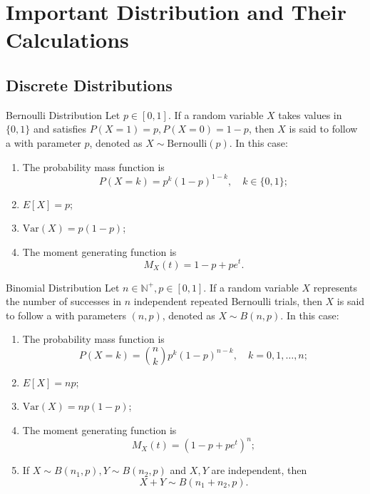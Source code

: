 \documentclass[../main.tex]{subfiles}
\begin{document}
\ifSubfilesClassLoaded{

    
}{}

\chapter{ Important Distribution and Their Calculations }
\section{Discrete Distributions}
\begin{proposition}{Bernoulli Distribution}{}
Let $p \in [0,1]$. If a random variable $X$ takes values in $\{0,1\}$ and satisfies $P(X=1)=p, P(X=0)=1-p$, then $X$ is said to follow a  with parameter $p$, denoted as $X \sim \text{Bernoulli}(p)$. In this case:

\begin{enumerate}
\item The probability mass function is 
\[P(X=k) = p^k(1-p)^{1-k}, \quad k \in \{0,1\};\]

\item $E[X] = p$;

\item $\text{Var}(X) = p(1-p)$;

\item The moment generating function is 
\[M_X(t) = 1-p+pe^t.\]
\end{enumerate}
\end{proposition}

\begin{proposition}{Binomial Distribution}{}
Let $n \in \mathbb{N}^+, p \in [0,1]$. If a random variable $X$ represents the number of successes in $n$ independent repeated Bernoulli trials, then $X$ is said to follow a  with parameters $(n,p)$, denoted as $X \sim B(n,p)$. In this case:

\begin{enumerate}
\item The probability mass function is 
\[P(X=k) = \binom{n}{k}p^k(1-p)^{n-k}, \quad k=0,1,\ldots,n;\]

\item $E[X] = np$;

\item $\text{Var}(X) = np(1-p)$;

\item The moment generating function is 
\[M_X(t) = (1-p+pe^t)^n;\]

\item If $X \sim B(n_1,p), Y \sim B(n_2,p)$ and $X,Y$ are independent, then 
\[X+Y \sim B(n_1+n_2,p).\]
\end{enumerate}
\end{proposition}
\end{document}
